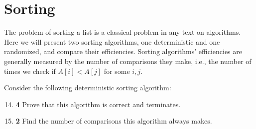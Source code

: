 \documentclass[12pt]{article}
\theoremstyle{plain}
\theoremstyle{definition}
\theoremstyle{remark}
\newcommand{\pts}[1]{\lbrack\textbf{#1}\rbrack}
\begin{document}
\section{Sorting}

The problem of sorting a list is a classical problem in any text on algorithms. Here we will present two sorting algorithms, one deterministic and one randomized, and compare their efficiencies. Sorting algorithms' efficiencies are generally measured by the number of comparisons they make, i.e., the number of times we check if $A[i]<A[j]$ for some $i,j$.

Consider the following deterministic sorting algorithm:

\newpage

\begin{algorithm}
\DontPrintSemicolon
{}
\end{algorithm}

\vspace{-10pt}

\begin{enumerate}
\setcounter{enumi}{13}

\item \pts{4} Prove that this algorithm is correct and terminates.

\begin{comment}\begin{tcolorbox}
It clearly terminates since there are a finite number of steps. At the end of the inner \textbf{for} loop, $L[i]$ will have been replaced with $\min_{i\le j\le n}L[j]$. Thus, after each iteration of the outer \textbf{for} loop, we know that $(L[1],\dots,L[i])$ is a sorted list of the smallest elements of $L$.
\end{tcolorbox}\end{comment}

\item \pts{2} Find the number of comparisons this algorithm always makes.

\begin{comment}\begin{tcolorbox}
It makes one comparison for each pair of $1\le i<j\le n$. That is $\binom{n}2=\frac{n(n-1)}2$ comparisons.
\end{tcolorbox}\end{comment}
\end{enumerate}
\end{document}
